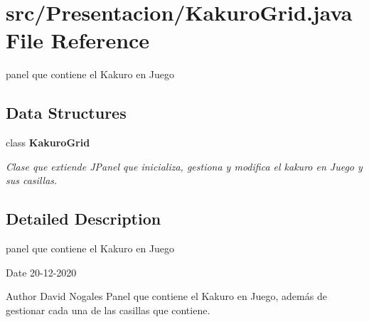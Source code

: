 \section{src/\+Presentacion/\+Kakuro\+Grid.java File Reference}
\label{_kakuro_grid_8java}


panel que contiene el Kakuro en Juego  


\subsection*{Data Structures}
\begin{DoxyCompactItemize}
\item 
class {\bfseries Kakuro\+Grid}
\begin{DoxyCompactList}\small\item\em Clase que extiende J\+Panel que inicializa, gestiona y modifica el kakuro en Juego y sus casillas. \end{DoxyCompactList}\end{DoxyCompactItemize}


\subsection{Detailed Description}
panel que contiene el Kakuro en Juego 

\begin{DoxyDate}{Date}
20-\/12-\/2020 
\end{DoxyDate}
\begin{DoxyAuthor}{Author}
David Nogales Panel que contiene el Kakuro en Juego, además de gestionar cada una de las casillas que contiene. 
\end{DoxyAuthor}
